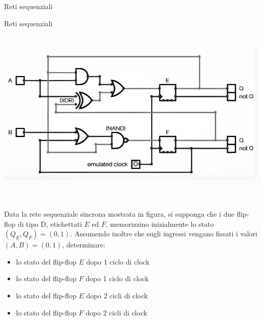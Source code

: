 \documentclass[11pt]{article}
\begin{document}
\begin{quiz}{Reti sequenziali}
\begin{cloze}[points=1,shuffle=false]{Reti sequenziali}
    \includegraphics[height=9cm]{figures/seq_1.png}
    
    Data la rete sequenziale sincrona mostrata in figura, si supponga che i due flip-flop di tipo D,
    etichettati $E$ ed $F$, memorizzino inizialmente lo stato $(Q_E,Q_F) = (0,1)$.
    Assumendo inoltre che sugli ingressi vengano fissati i valori $(A,B)=(0,1)$,
    determinare:
    
    \begin{itemize}
    \item lo stato del flip-flop $E$ dopo 1 ciclo di clock 
    \item lo stato del flip-flop $F$ dopo 1 ciclo di clock 
    \item lo stato del flip-flop $E$ dopo 2 cicli di clock 
    \item lo stato del flip-flop $F$ dopo 2 cicli di clock 
    \end{itemize}
\end{cloze}


\end{quiz}
\end{document}
